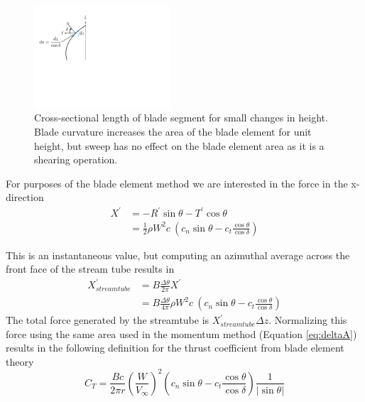 \documentclass{article}
\begin{document}
\begin{figure}[htbp]
\begin{center}
\includegraphics[width=2in]{images/dl}
\caption{Cross-sectional length of blade segment for small changes in height.  Blade curvature increases the area of the blade element for unit height, but sweep has no effect on the blade element area as it is a shearing operation.}
\label{fig:dl}
\end{center}
\end{figure}


For purposes of the blade element method we are interested in the force in the x-direction
\begin{equation}
\begin{aligned}
  X^\prime &= -R^\prime \sin\theta - T^\prime \cos\theta \\
  &= \frac{1}{2} \rho W^2 c\ (c_n \sin\theta - c_t \frac{\cos \theta}{\cos\delta})
  \label{eq:xprime}
\end{aligned}
\end{equation}

This is an instantaneous value, but computing an azimuthal average across the front face of the stream tube results in
\begin{equation}
\begin{aligned}
  X^\prime_{streamtube} &= B \frac{\Delta \theta}{2\pi} X^\prime\\
  &= B \frac{\Delta \theta}{4\pi} \rho W^2 c\ (c_n \sin\theta - c_t \frac{\cos \theta}{\cos\delta})
\end{aligned}
\end{equation}
The total force generated by the streamtube is $X^\prime_{streamtube} \Delta z$.  Normalizing this force using the same area used in the momentum method (Equation \eqref{eq:deltaA}) results in the following definition for the thrust coefficient from blade element theory
\begin{equation}
  C_T =  \frac{B c}{2 \pi r} \left(\frac{W}{V_\infty}\right)^2   (c_n \sin\theta - c_t \frac{\cos \theta}{\cos\delta}) \frac{1}{|\sin\theta| }
  \label{eq:ctbem}
\end{equation}
\end{document}
